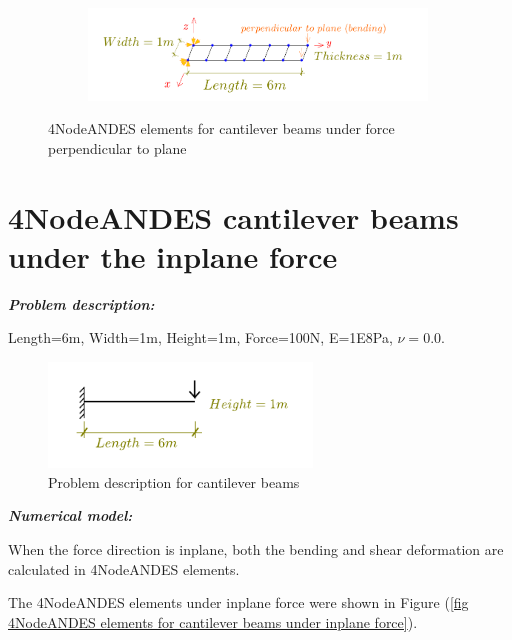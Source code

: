 \documentclass[fleqn,11pt,letter]{article}
\begin{document}
\begin{figure}[H]
  \centering
  \begin{subfigure}{0.5\textwidth}
    \centering
    \includegraphics[width=9cm]{../Figure_files/4NodeANDES/beam_ANDES_xy_bending_6div.pdf}
  \end{subfigure}
  \captionsetup{justification=centering,margin=3cm}
  \caption{4NodeANDES elements for cantilever beams under force perpendicular to plane}
  \label{fig 4NodeANDES elements for cantilever beams under force perpendicular to plane}
\end{figure}









\newpage
\section{4NodeANDES cantilever beams under the inplane force}



\emph{\textbf{Problem description:}}

Length=6m, Width=1m, Height=1m, Force=100N, E=1E8Pa, $\nu=0.0$. 

\begin{figure}[H]
  \centering
  \includegraphics[width=7cm]{../Figure_files/4NodeANDES/cantilever_6.pdf}
  \caption{Problem description for cantilever beams}
  \label{fig Problem description for cantilever 4 2}
\end{figure}


\noindent \emph{\textbf{Numerical model:}}

When the force direction is inplane, both the bending and shear deformation are calculated in 4NodeANDES elements. 

The 4NodeANDES elements under inplane force were shown in Figure (\ref{fig 4NodeANDES elements for cantilever beams under inplane force}).
\end{document}
